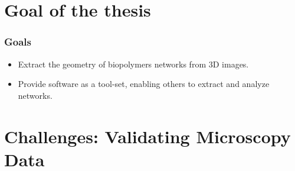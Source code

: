 \documentclass[9pt]{beamer}
\begin{document}
\section{Goal of the thesis}
\begin{frame}
  \frametitle{Goals}
  \begin{exampleblock}{}
  \begin{itemize}
    \item<1-> Extract the geometry of biopolymers networks from 3D images.
    \item<2-> Provide software as a tool-set, enabling others to extract and analyze networks.
  \end{itemize}
  \end{exampleblock}
\end{frame}
%

\section{Challenges: Validating Microscopy Data}
\end{document}
